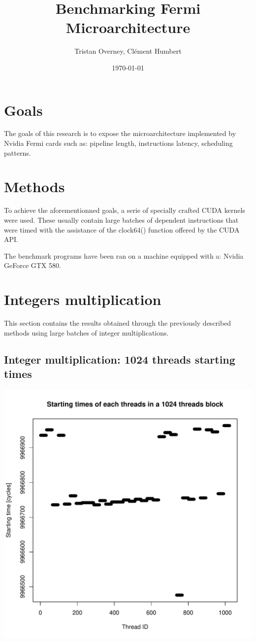 \documentclass{article}
\begin{document}
\title{Benchmarking Fermi Microarchitecture}
\author{Tristan Overney, Cl\'{e}ment Humbert}
\date{\today}
\maketitle

\section{Goals}
	The goals of this research is to expose the microarchitecture implemented by
	Nvidia Fermi cards such as: pipeline length, instructions latency, scheduling
	patterns.

\section{Methods}
	To achieve the aforementionned goals, a serie of specially crafted CUDA kernels
	were used. These usually contain large batches of dependent instructions that were 
	timed with the assistance of the clock64() function offered by the CUDA API.

	The benchmark programs have been ran on a machine equipped with a: 
	Nvidia GeForce GTX 580.

\section{Integers multiplication}
	This section contains the results obtained through the previously described
	methods using large batches of integer multiplications.

	\subsection{Integer multiplication: 1024 threads starting times}
	\includegraphics[width=\linewidth]{"graphics/starting_times_ratio31"}
	\pagebreak
\end{document}
